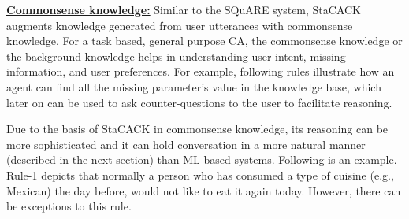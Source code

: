 \documentclass[letterpaper]{article}
\begin{document}
\noindent\textbf{\underline{Commonsense knowledge:}}
Similar to the SQuARE system, StaCACK augments knowledge generated from user utterances with commonsense knowledge. For a task based, general purpose CA, the commonsense knowledge or the background knowledge helps in understanding user-intent, missing information, and user preferences. For example, following rules illustrate how an agent can find all the missing parameter's value in the knowledge base, which later on can be used to ask counter-questions to the user to facilitate reasoning.  

\noindent
\cprotect {}

Due to the basis of StaCACK in commonsense knowledge, its reasoning can be more sophisticated and it can hold  conversation in a more natural manner (described in the next section) than ML based systems. Following is an example. Rule-1 depicts that normally a person who has consumed a type of cuisine (e.g., Mexican) the day before, would not like to eat it again today. However, there can be exceptions to this rule.

\noindent
\cprotect {}

\end{document}
